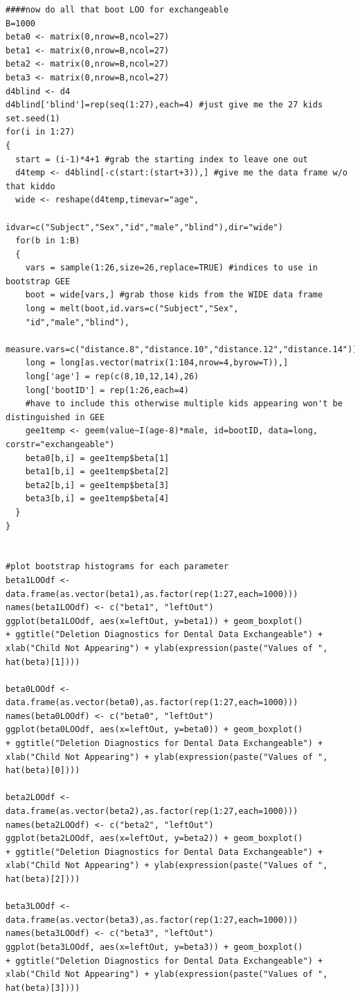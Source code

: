 \documentclass[11pt]{article}
\begin{document}
\begin{verbatim}
####now do all that boot LOO for exchangeable
B=1000
beta0 <- matrix(0,nrow=B,ncol=27)
beta1 <- matrix(0,nrow=B,ncol=27)
beta2 <- matrix(0,nrow=B,ncol=27)
beta3 <- matrix(0,nrow=B,ncol=27)
d4blind <- d4
d4blind['blind']=rep(seq(1:27),each=4) #just give me the 27 kids
set.seed(1)
for(i in 1:27)
{
  start = (i-1)*4+1 #grab the starting index to leave one out
  d4temp <- d4blind[-c(start:(start+3)),] #give me the data frame w/o that kiddo
  wide <- reshape(d4temp,timevar="age",
                  idvar=c("Subject","Sex","id","male","blind"),dir="wide")
  for(b in 1:B)
  {
    vars = sample(1:26,size=26,replace=TRUE) #indices to use in bootstrap GEE
    boot = wide[vars,] #grab those kids from the WIDE data frame
    long = melt(boot,id.vars=c("Subject","Sex",
    "id","male","blind"),
                measure.vars=c("distance.8","distance.10","distance.12","distance.14"))
    long = long[as.vector(matrix(1:104,nrow=4,byrow=T)),]
    long['age'] = rep(c(8,10,12,14),26)
    long['bootID'] = rep(1:26,each=4) 
    #have to include this otherwise multiple kids appearing won't be distinguished in GEE
    gee1temp <- geem(value~I(age-8)*male, id=bootID, data=long, corstr="exchangeable")
    beta0[b,i] = gee1temp$beta[1]
    beta1[b,i] = gee1temp$beta[2]
    beta2[b,i] = gee1temp$beta[3]
    beta3[b,i] = gee1temp$beta[4]
  }
}


#plot bootstrap histograms for each parameter
beta1LOOdf <- data.frame(as.vector(beta1),as.factor(rep(1:27,each=1000)))
names(beta1LOOdf) <- c("beta1", "leftOut")
ggplot(beta1LOOdf, aes(x=leftOut, y=beta1)) + geom_boxplot() 
+ ggtitle("Deletion Diagnostics for Dental Data Exchangeable") + xlab("Child Not Appearing") + ylab(expression(paste("Values of ", hat(beta)[1])))

beta0LOOdf <- data.frame(as.vector(beta0),as.factor(rep(1:27,each=1000)))
names(beta0LOOdf) <- c("beta0", "leftOut")
ggplot(beta0LOOdf, aes(x=leftOut, y=beta0)) + geom_boxplot() 
+ ggtitle("Deletion Diagnostics for Dental Data Exchangeable") + xlab("Child Not Appearing") + ylab(expression(paste("Values of ", hat(beta)[0])))

beta2LOOdf <- data.frame(as.vector(beta2),as.factor(rep(1:27,each=1000)))
names(beta2LOOdf) <- c("beta2", "leftOut")
ggplot(beta2LOOdf, aes(x=leftOut, y=beta2)) + geom_boxplot() 
+ ggtitle("Deletion Diagnostics for Dental Data Exchangeable") + xlab("Child Not Appearing") + ylab(expression(paste("Values of ", hat(beta)[2])))

beta3LOOdf <- data.frame(as.vector(beta3),as.factor(rep(1:27,each=1000)))
names(beta3LOOdf) <- c("beta3", "leftOut")
ggplot(beta3LOOdf, aes(x=leftOut, y=beta3)) + geom_boxplot() 
+ ggtitle("Deletion Diagnostics for Dental Data Exchangeable") + xlab("Child Not Appearing") + ylab(expression(paste("Values of ", hat(beta)[3])))



\end{verbatim}
\end{document}
